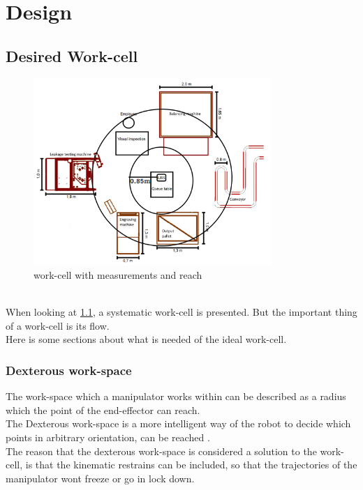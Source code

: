 \chapter{Design}\label{Design}

\section{Desired Work-cell}

\begin{figure}[h]
    \centering
    \includegraphics[width=9cm]{Design/Work_cell_3.png}
    \caption{work-cell with measurements and reach}
    \label{fig:workcellMR}
\end{figure}
\\
When looking at \ref{fig:workcellMR}, a systematic work-cell is presented. But the important thing of a work-cell is its flow.\\
Here is some sections about what is needed of the ideal work-cell.

\subsection{Dexterous work-space}

The work-space which a manipulator works within can be described as a radius which the point of the end-effector can reach.\\
The Dexterous work-space is a more intelligent way of the robot to decide which points in arbitrary orientation, can be reached \cite{Dexterous}.\\
The reason that the dexterous work-space is considered a solution to the work-cell, is that the kinematic restrains can be included, so that the trajectories of the manipulator wont freeze or go in lock down.\\


